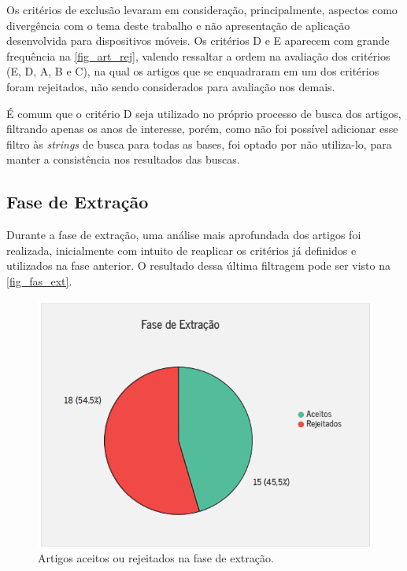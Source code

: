 Os critérios de exclusão levaram em consideração, principalmente, aspectos como divergência com o tema deste trabalho e não apresentação de aplicação desenvolvida para dispositivos móveis.
Os critérios D e E aparecem com grande frequência na \autoref{fig_art_rej}, valendo ressaltar a ordem na avaliação dos critérios (E, D, A, B e C), na qual os artigos que se enquadraram em um dos critérios foram rejeitados, não sendo considerados para avaliação nos demais.

É comum que o critério D seja utilizado no próprio processo de busca dos artigos, filtrando apenas os anos de interesse, porém, como não foi possível adicionar esse filtro às \emph{strings} de busca para todas as bases, foi optado por não utiliza-lo, para manter a consistência nos resultados das buscas.

\newpage

\subsection{Fase de Extração}

Durante a fase de extração, uma análise mais aprofundada dos artigos foi realizada, inicialmente com intuito de reaplicar os critérios já definidos e utilizados na fase anterior.
O resultado dessa última filtragem pode ser visto na \autoref{fig_fas_ext}.

\begin{figure}[htb]
  \caption{\label{fig_fas_ext}Artigos aceitos ou rejeitados na fase de extração.}
  \begin{center}
    \includegraphics[scale=0.95]{Imagens/msl/fase_extracao_artigos.png}
  \end{center}
\end{figure}


